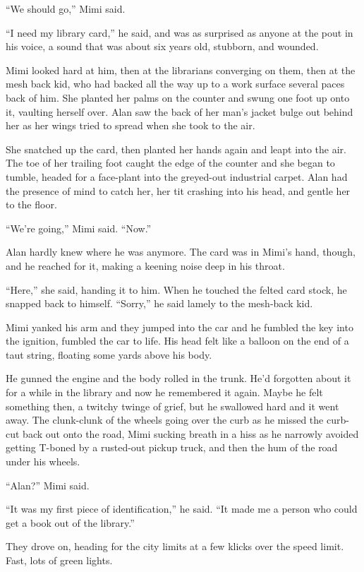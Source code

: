``We should go,'' Mimi said.

``I need my library card,'' he said, and was as surprised as anyone at
the pout in his voice, a sound that was about six years old, stubborn,
and wounded.

Mimi looked hard at him, then at the librarians converging on them,
then at the mesh back kid, who had backed all the way up to a work
surface several paces back of him.  She planted her palms on the
counter and swung one foot up onto it, vaulting herself over.  Alan
saw the back of her man's jacket bulge out behind her as her wings
tried to spread when she took to the air.

She snatched up the card, then planted her hands again and leapt into
the air.  The toe of her trailing foot caught the edge of the counter
and she began to tumble, headed for a face-plant into the greyed-out
industrial carpet.  Alan had the presence of mind to catch her, her
tit crashing into his head, and gentle her to the floor.

``We're going,'' Mimi said.  ``Now.''

Alan hardly knew where he was anymore.  The card was in Mimi's hand,
though, and he reached for it, making a keening noise deep in his
throat.

``Here,'' she said, handing it to him.  When he touched the felted
card stock, he snapped back to himself.  ``Sorry,'' he said lamely to
the mesh-back kid.

Mimi yanked his arm and they jumped into the car and he fumbled the
key into the ignition, fumbled the car to life.  His head felt like a
balloon on the end of a taut string, floating some yards above his
body.

He gunned the engine and the body rolled in the trunk.  He'd forgotten
about it for a while in the library and now he remembered it again. 
Maybe he felt something then, a twitchy twinge of grief, but he
swallowed hard and it went away.  The clunk-clunk of the wheels going
over the curb as he missed the curb-cut back out onto the road, Mimi
sucking breath in a hiss as he narrowly avoided getting T-boned by a
rusted-out pickup truck, and then the hum of the road under his
wheels.

``Alan?'' Mimi said.

``It was my first piece of identification,'' he said.  ``It made me a
person who could get a book out of the library.''

They drove on, heading for the city limits at a few klicks over the
speed limit.  Fast, lots of green lights.

